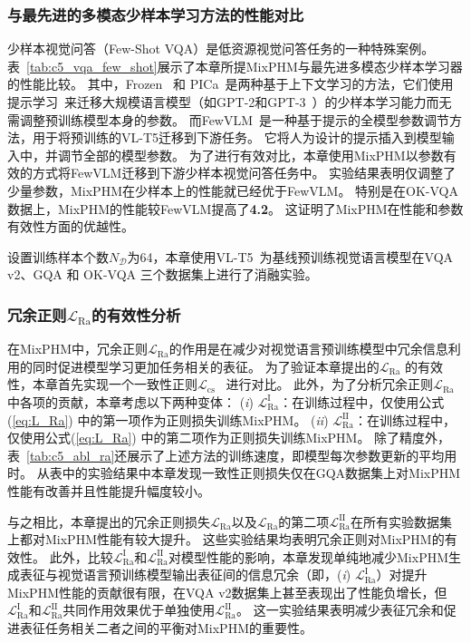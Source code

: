 \subsubsection{与最先进的多模态少样本学习方法的性能对比}
少样本视觉问答（Few-Shot VQA）是低资源视觉问答任务的一种特殊案例。
表~\ref{tab:c5_vqa_few_shot}展示了本章所提MixPHM与最先进多模态少样本学习器的性能比较。
其中，Frozen~\cite{tsimpoukelli2021multimodal} 和 PICa~\cite{yang2022empirical}是两种基于上下文学习的方法，它们使用提示学习~\cite{lester2021power}来迁移大规模语言模型（如GPT-2和GPT-3~\cite{brown2020language}）的少样本学习能力而无需调整预训练模型本身的参数。
而FewVLM~\cite{jin2022good}是一种基于提示的全模型参数调节方法，用于将预训练的VL-T5迁移到下游任务。
它将人为设计的提示插入到模型输入中，并调节全部的模型参数。
为了进行有效对比，本章使用MixPHM以参数有效的方式将FewVLM迁移到下游少样本视觉问答任务中。
实验结果表明仅调整了少量参数，MixPHM在少样本上的性能就已经优于FewVLM。
特别是在OK-VQA数据上，MixPHM的性能较FewVLM提高了\textbf{4.2}。
这证明了MixPHM在性能和参数有效性方面的优越性。




设置训练样本个数$N_{\mathcal{D}}$为64，本章使用VL-T5~\cite{cho2021unifying}为基线预训练视觉语言模型在VQA v2、GQA 和 OK-VQA 三个数据集上进行了消融实验。


\subsubsection{冗余正则$\mathcal{L}_{\text{Ra}}$的有效性分析}
在MixPHM中，冗余正则$\mathcal{L}_{\text{Ra}}$的作用是在减少对视觉语言预训练模型中冗余信息利用的同时促进模型学习更加任务相关的表征。
为了验证本章提出的$\mathcal{L}_{\text{Ra}}$ 的有效性，本章首先实现一个一致性正则$\mathcal{L}_{\text{cs}}$~\cite{zuo2022taming} 进行对比。
此外，为了分析冗余正则$\mathcal{L}_{\text{Ra}}$ 中各项的贡献，本章考虑以下两种变体：
(\emph{i}) ${\mathcal{L}^{\text{I}}_{\text{Ra}}}$：在训练过程中，仅使用公式(\ref{eq:L_Ra}) 中的第一项作为正则损失训练MixPHM。
(\emph{ii}) ${\mathcal{L}^{\text{II}}_{\text{Ra}}}$：在训练过程中，仅使用公式(\ref{eq:L_Ra}) 中的第二项作为正则损失训练MixPHM。
除了精度外，表~\ref{tab:c5_abl_ra}还展示了上述方法的训练速度，即模型每次参数更新的平均用时。
从表中的实验结果中本章发现一致性正则损失仅在GQA数据集上对MixPHM性能有改善并且性能提升幅度较小。

与之相比，本章提出的冗余正则损失$\mathcal{L}_{\text{Ra}}$以及$\mathcal{L}_{\text{Ra}}$的第二项${\mathcal{L}^{\text{II}}_{\text{Ra}}}$在所有实验数据集上都对MixPHM性能有较大提升。
这些实验结果均表明冗余正则对MixPHM的有效性。
此外，比较${\mathcal{L}^{\text{I}}_{\text{Ra}}}$和${\mathcal{L}^{\text{II}}_{\text{Ra}}}$对模型性能的影响，本章发现单纯地减少MixPHM生成表征与视觉语言预训练模型输出表征间的信息冗余（即，(\emph{i}) ${\mathcal{L}^{\text{I}}_{\text{Ra}}}$）对提升MixPHM性能的贡献很有限，在VQA v2数据集上甚至表现出了性能负增长，但${\mathcal{L}^{\text{I}}_{\text{Ra}}}$和${\mathcal{L}^{\text{II}}_{\text{Ra}}}$共同作用效果优于单独使用${\mathcal{L}^{\text{II}}_{\text{Ra}}}$。
这一实验结果表明减少表征冗余和促进表征任务相关二者之间的平衡对MixPHM的重要性。


